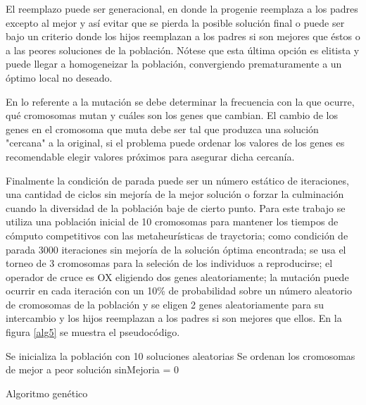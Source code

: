 \documentclass{ci5652}
\begin{document}
El reemplazo puede ser generacional, en donde la progenie reemplaza a los padres excepto al mejor y así evitar que se pierda la posible solución final o puede ser bajo un criterio donde los hijos reemplazan a los padres si son mejores que éstos o a las peores soluciones de la población. Nótese que esta última opción es elitista y puede llegar a homogeneizar la población, convergiendo prematuramente a un óptimo local no deseado.

En lo referente a la mutación se debe determinar la frecuencia con la que ocurre, qué cromosomas mutan y cuáles son los genes que cambian. El cambio de los genes en el cromosoma que muta debe ser tal que produzca una solución "cercana" a la original, si el problema puede ordenar los valores de los genes es recomendable elegir valores próximos para asegurar dicha cercanía.

Finalmente la condición de parada puede ser un número estático de iteraciones, una cantidad de ciclos sin mejoría de la mejor solución o forzar la culminación cuando la diversidad de la población baje de cierto punto. Para este trabajo se utiliza una población inicial de 10 cromosomas para mantener los tiempos de cómputo competitivos con las metaheurísticas de trayctoria; como condición de parada 3000 iteraciones sin mejoría de la solución óptima encontrada; se usa el torneo de 3 cromosomas para la seleción de los individuos a reproducirse; el operador de cruce es OX eligiendo dos genes aleatoriamente; la mutación puede ocurrir en cada iteración con un 10\% de probabilidad sobre un número aleatorio de cromosomas de la población y se eligen 2 genes aleatoriamente para su intercambio y los hijos reemplazan a los padres si son mejores que ellos. En la figura  \ref{alg5} se muestra el pseudocódigo.

\begin{algorithm}
 \label{alg5}
 \DontPrintSemicolon
 \vspace*{0.1cm}
 Se inicializa la población con 10 soluciones aleatorias \;
 Se ordenan los cromosomas de mejor a peor solución \;
 sinMejoria = 0 \;
 \vspace*{0.1cm}
 \caption{Algoritmo genético}
\end{algorithm}
\end{document}
